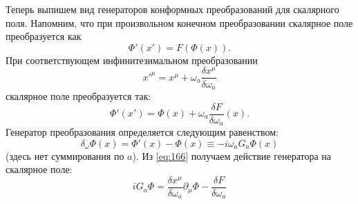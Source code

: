 \documentclass[a4paper,12pt]{article}
\theoremstyle{definition}
\theoremstyle{definition}
\theoremstyle{definition}
\begin{document}
Теперь выпишем вид генераторов конформных преобразований для скалярного поля. 
Напомним, что при произвольном конечном преобразовании скалярное поле преобразуется как
\begin{equation}
  \label{eq:164}
  \Phi'(x')=F(\Phi(x)).
\end{equation}
При соответствующем инфинитезимальном преобразовании
\begin{equation}
  \label{eq:165}
  x'^{\mu}=x^{\mu}+\omega_a \frac{\delta x^{\mu}}{\delta \omega_a}
\end{equation}
скалярное поле преобразуется так:
\begin{equation}
  \label{eq:166}
  \Phi'(x')=\Phi(x)+\omega_a \frac{\delta F}{\delta \omega_a} (x).
\end{equation}
Генератор преобразования определяется следующим равенством:
\begin{equation}
  \label{eq:167}
  \delta_{\omega} \Phi(x)=\Phi'(x)-\Phi(x)\equiv -i\omega_a G_a \Phi(x)
\end{equation}
(здесь нет суммирования по $a$). Из \eqref{eq:166} получаем действие генератора на скалярное поле:
\begin{equation}
  \label{eq:168}
  iG_a \Phi=\frac{\delta x^{\mu}}{\delta\omega_a} \partial_{\mu}\Phi-\frac{\delta F}{\delta \omega_a}
\end{equation}
\end{document}
